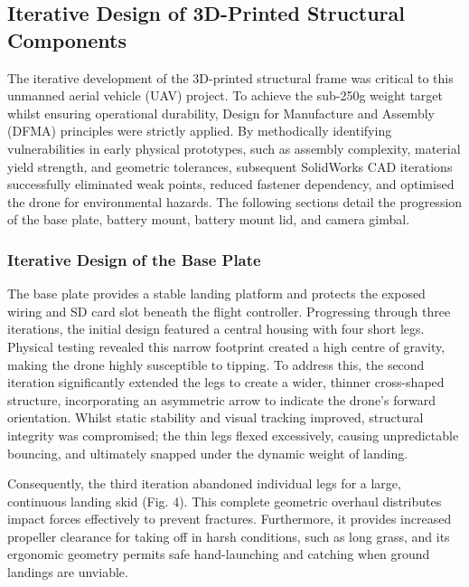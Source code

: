 \documentclass[conference]{IEEEtran}
\begin{document}
\subsection*{Iterative Design of 3D-Printed Structural Components}

The iterative development of the 3D-printed structural frame was critical to this unmanned aerial vehicle (UAV) project. To achieve the sub-250g weight target whilst ensuring operational durability, Design for
Manufacture and Assembly (DFMA) principles were strictly applied. By methodically identifying vulnerabilities in early physical prototypes, such as assembly complexity, material yield strength, and geometric tolerances, subsequent SolidWorks CAD iterations successfully eliminated weak points, reduced fastener dependency, and optimised the drone for environmental hazards. The following sections detail the progression of the base plate, battery mount, battery mount lid, and camera gimbal.

\subsubsection*{Iterative Design of the Base Plate}

The base plate provides a stable landing platform and protects the exposed wiring and SD card slot beneath the flight controller. Progressing through three iterations, the initial design featured a central housing with four short legs. Physical testing revealed this narrow footprint created a high centre of gravity, making the drone highly susceptible to tipping. To
address this, the second iteration significantly extended the legs to create a wider, thinner cross-shaped structure, incorporating an asymmetric arrow to indicate the drone's forward orientation. Whilst static stability and visual tracking improved, structural integrity was compromised; the thin legs flexed excessively, causing unpredictable bouncing, and ultimately snapped under the dynamic weight of landing.

Consequently, the third iteration abandoned individual legs for a large, continuous landing skid (Fig. 4). This complete geometric overhaul distributes impact forces effectively to prevent fractures. Furthermore, it provides increased propeller clearance for taking off in harsh conditions, such as long grass, and its ergonomic geometry permits safe hand-launching and
catching when ground landings are unviable.
\end{document}
